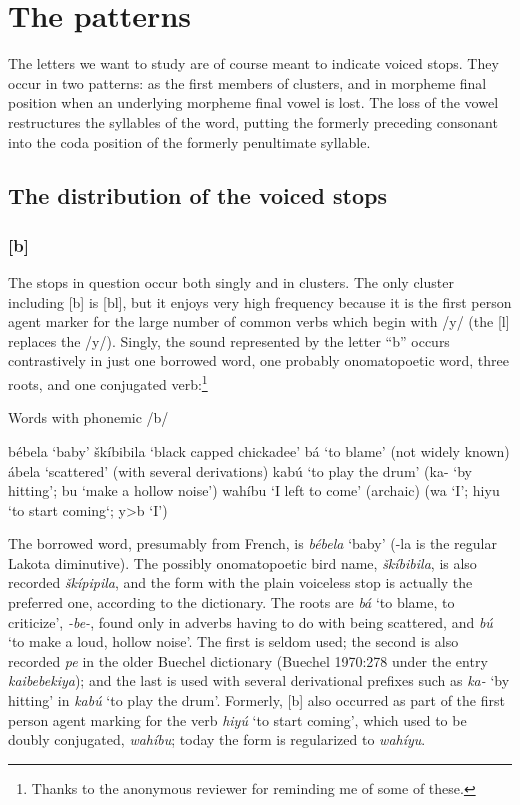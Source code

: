 \documentclass[output=paper]{LSP/langsci}
\begin{document}
\section{The patterns}

The letters we want to study are of course meant to indicate voiced stops. They occur in two patterns: as the first members of clusters, and in morpheme final position when an underlying morpheme final vowel is lost. The loss of the vowel restructures the syllables of the word, putting the formerly preceding consonant into the coda position of the formerly penultimate syllable.

\subsection{The distribution of the voiced stops}

\subsubsection{[b]}

The stops in question occur both singly and in clusters. The only cluster including [b] is [bl], but it enjoys very high frequency because it is the first person agent marker for the large number of common verbs which begin with /y/ (the [l] replaces the /y/). Singly, the sound represented by the letter ``b'' occurs contrastively in just one borrowed word, one probably onomatopoetic word, three roots, and one conjugated verb:\footnote{Thanks to the anonymous reviewer for reminding me of some of these.}

\begin{exe} 
\ex Words with phonemic /b/
\begin{xlist}
\ex b\'ebela `baby'
\ex \v{s}k\'ibibila `black capped chickadee'
\ex b\'a `to blame' (not widely known)
\ex \'abela `scattered' (with several derivations)
\ex kab\'u `to play the drum' (ka- `by hitting'; bu `make a hollow noise')
\ex wah\'ibu `I left to come' (archaic) (wa `I'; hiyu `to start coming`; y>b `I')
\end{xlist}
\end{exe}

The borrowed word, presumably from French, is \textit{b\'ebela} `baby' (-la is the regular Lakota diminutive). The possibly onomatopoetic bird name, \textit{\v{s}k\'ibibila}, is also recorded \textit{\v{s}k\'ipipila}, and the form with the plain voiceless stop is actually the preferred one, according to the dictionary. The roots are \textit{b\'a} `to blame, to criticize', \textit{-be-}, found only in adverbs having to do with being scattered, and \textit{b\'u} `to make a loud, hollow noise'. The first is seldom used; the second is also recorded \textit{pe} in the older Buechel dictionary (Buechel 1970:278 under the entry \textit{kaibebekiya}); and the last is used with several derivational prefixes such as \textit{ka-} `by hitting' in \textit{kab\'u} `to play the drum'. Formerly, [b] also occurred as part of the first person agent marking for the verb \textit{hiy\'u} `to start coming', which used to be doubly conjugated, \textit{wah\'ibu}; today the form is regularized to \textit{wah\'iyu}.
\end{document}
